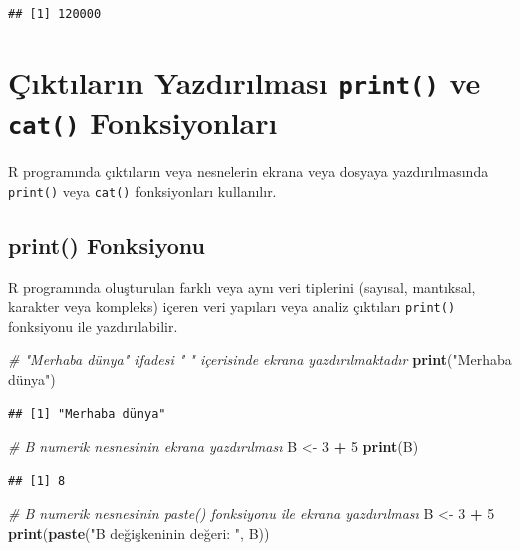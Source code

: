 \documentclass[
]{book}
\newenvironment{Shaded}{\begin{snugshade}}{\end{snugshade}}
\newcommand{\CommentTok}[1]{\textcolor[rgb]{0.56,0.35,0.01}{\textit{#1}}}
\newcommand{\DecValTok}[1]{\textcolor[rgb]{0.00,0.00,0.81}{#1}}
\newcommand{\FunctionTok}[1]{\textcolor[rgb]{0.13,0.29,0.53}{\textbf{#1}}}
\newcommand{\NormalTok}[1]{#1}
\newcommand{\OtherTok}[1]{\textcolor[rgb]{0.56,0.35,0.01}{#1}}
\newcommand{\SpecialCharTok}[1]{\textcolor[rgb]{0.81,0.36,0.00}{\textbf{#1}}}
\newcommand{\StringTok}[1]{\textcolor[rgb]{0.31,0.60,0.02}{#1}}
\begin{document}
\begin{verbatim}
## [1] 120000
\end{verbatim}

\section{\texorpdfstring{Çıktıların Yazdırılması \texttt{print()} ve \texttt{cat()} Fonksiyonları}{Çıktıların Yazdırılması print() ve cat() Fonksiyonları}}\label{uxe7ux131ktux131larux131n-yazdux131rux131lmasux131-print-ve-cat-fonksiyonlarux131}

R programında çıktıların veya nesnelerin ekrana veya dosyaya yazdırılmasında \texttt{print()} veya \texttt{cat()} fonksiyonları kullanılır.

\subsection{print() Fonksiyonu}\label{print-fonksiyonu}

R programında oluşturulan farklı veya aynı veri tiplerini (sayısal, mantıksal, karakter veya kompleks) içeren veri yapıları veya analiz çıktıları \texttt{print()} fonksiyonu ile yazdırılabilir.

\begin{Shaded}
\begin{Highlighting}[]
\CommentTok{\# "Merhaba dünya" ifadesi " " içerisinde ekrana yazdırılmaktadır}
\FunctionTok{print}\NormalTok{(}\StringTok{"Merhaba dünya"}\NormalTok{)}
\end{Highlighting}
\end{Shaded}

\begin{verbatim}
## [1] "Merhaba dünya"
\end{verbatim}

\begin{Shaded}
\begin{Highlighting}[]
\CommentTok{\# B numerik nesnesinin ekrana yazdırılması}
\NormalTok{B }\OtherTok{\textless{}{-}} \DecValTok{3} \SpecialCharTok{+} \DecValTok{5}
\FunctionTok{print}\NormalTok{(B)}
\end{Highlighting}
\end{Shaded}

\begin{verbatim}
## [1] 8
\end{verbatim}

\begin{Shaded}
\begin{Highlighting}[]
\CommentTok{\# B numerik nesnesinin paste() fonksiyonu ile ekrana yazdırılması}
\NormalTok{B }\OtherTok{\textless{}{-}} \DecValTok{3} \SpecialCharTok{+} \DecValTok{5}
\FunctionTok{print}\NormalTok{(}\FunctionTok{paste}\NormalTok{(}\StringTok{"B değişkeninin değeri: "}\NormalTok{, B))}
\end{Highlighting}
\end{Shaded}
\end{document}
